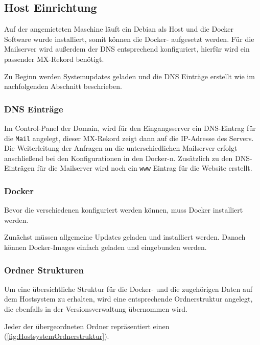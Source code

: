\documentclass[a4paper,11pt,singlespacing]{article}
\begin{document}
		
	\subsection{Host Einrichtung}\label{sec:UmsetzungHostEinrichtung}
		Auf der angemieteten Maschine läuft ein Debian als Host und die Docker Software wurde installiert, somit können die Docker- aufgesetzt werden. Für die Mailserver wird au{\ss}erdem der DNS entsprechend konfiguriert, hierfür wird ein passender MX-Rekord benötigt.
		
		Zu Beginn werden Systemupdates geladen und die DNS Einträge erstellt wie im nachfolgenden Abschnitt beschrieben.
		
		\subsubsection{DNS Einträge}\label{sec:DNSEinträge}
			Im Control-Panel der Domain, wird für den Eingangsserver ein DNS-Eintrag für die \texttt{Mail} angelegt, dieser MX-Rekord zeigt dann auf die IP-Adresse des Servers. Die Weiterleitung der Anfragen an die unterschiedlichen Mailserver erfolgt anschlie{\ss}end bei den Konfigurationen in den  Docker-n.
			Zusätzlich zu den DNS-Einträgen für die Mailserver wird noch ein \texttt{www} Eintrag für die Website erstellt.

		\subsubsection{Docker}\label{sec:DockerAufsetzen}
			Bevor die verschiedenen  konfiguriert werden können, muss Docker installiert werden.
			
			Zunächst müssen allgemeine Updates geladen und installiert werden. Danach können Docker-Images einfach geladen und eingebunden werden.

		\subsubsection{Ordner Strukturen}\label{OrdnerStrukturen}
	
			Um eine übersichtliche Struktur für die Docker- und die zugehörigen Daten auf dem Hostsystem zu erhalten, wird eine entsprechende Ordnerstruktur angelegt, die ebenfalls in der Versionsverwaltung übernommen wird.
			
			Jeder der übergeordneten Ordner repräsentiert einen  (\autoref{fig:HostsystemOrdnerstruktur}).
			
\end{document}
